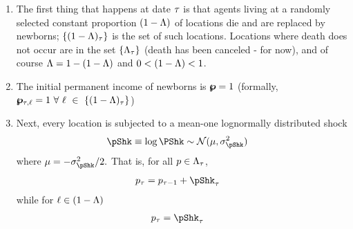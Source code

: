 \documentclass[../BufferStockTheory.tex]{subfiles}\usepackage{ApndxSteadyState}
\begin{document}
  \begin{enumerate}
  \item The first thing that happens at date $\tAbs$ is that agents living at a randomly selected constant proportion $\Die$ of locations die and are replaced by newborns; $\{\Die_{\tAbs}\}$ is the set of such locations.  Locations where death does not occur are in the set  $\{\Liv_{\tAbs}\}$ (death has been canceled - for now), and of course $\Liv=1-\Die$ and $0 < \Die < 1$.

  \item The initial permanent income of newborns is  $\pLev=1$ (formally, $\pLev_{\tAbs,\posn} = 1~\forall~\posn~\in~\{\Die_{\tAbs}\}$)
  \item Next, every location is subjected to a mean-one lognormally distributed shock
    \begin{equation}\begin{gathered}\begin{aligned}
      \pShk & \equiv \log \PShk \sim \mathcal{N}(\pShkMean,\sigma^{2}_{\pShk}) \label{eq:pShkDef}
    \end{aligned}\end{gathered}\end{equation}
    where $\pShkMean = -\sigma^{2}_{\pShk}/2.$  That is, for all $\pLog \in \Liv_{\tAbs}$, 
    \begin{equation}\begin{gathered}\begin{aligned}
      \pLog_{\tAbs} & = \pLog_{\tAbs-1}+\pShk_{\tAbs} \label{eq:pRandomwalk}
    \end{aligned}\end{gathered}\end{equation}
    while for $\posn \in \Die$
    \begin{equation}\begin{gathered}\begin{aligned}
      \pLog_{\tAbs} & = \pShk_{\tAbs} \label{eq:pStartsAtZero}
    \end{aligned}\end{gathered}\end{equation}
    

\end{enumerate}
\end{document}
